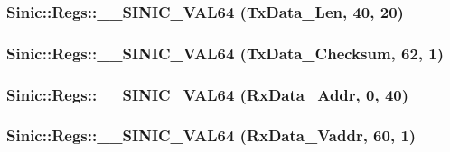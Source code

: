 \label{namespaceSinic_1_1Regs_a3bc0e3717e900c96e4f8aace95a88ef0}
\hypertarget{namespaceSinic_1_1Regs_aec2513afaf1ae9c58b736480c3219f56}{
\subsubsection[{\_\-\_\-SINIC\_\-VAL64}]{\setlength{\rightskip}{0pt plus 5cm}Sinic::Regs::\_\-\_\-SINIC\_\-VAL64 (TxData\_\-Len, \/  40, \/  20)}}
\label{namespaceSinic_1_1Regs_aec2513afaf1ae9c58b736480c3219f56}
\hypertarget{namespaceSinic_1_1Regs_a71e5336091cc0a002be6ddca4170f242}{
\subsubsection[{\_\-\_\-SINIC\_\-VAL64}]{\setlength{\rightskip}{0pt plus 5cm}Sinic::Regs::\_\-\_\-SINIC\_\-VAL64 (TxData\_\-Checksum, \/  62, \/  1)}}
\label{namespaceSinic_1_1Regs_a71e5336091cc0a002be6ddca4170f242}
\hypertarget{namespaceSinic_1_1Regs_a254e210bd0514c52c4201fce02fbde37}{
\subsubsection[{\_\-\_\-SINIC\_\-VAL64}]{\setlength{\rightskip}{0pt plus 5cm}Sinic::Regs::\_\-\_\-SINIC\_\-VAL64 (RxData\_\-Addr, \/  0, \/  40)}}
\label{namespaceSinic_1_1Regs_a254e210bd0514c52c4201fce02fbde37}
\hypertarget{namespaceSinic_1_1Regs_a7937ce95cf94fb75724a5aa46f980303}{
\subsubsection[{\_\-\_\-SINIC\_\-VAL64}]{\setlength{\rightskip}{0pt plus 5cm}Sinic::Regs::\_\-\_\-SINIC\_\-VAL64 (RxData\_\-Vaddr, \/  60, \/  1)}}
\label{namespaceSinic_1_1Regs_a7937ce95cf94fb75724a5aa46f980303}


